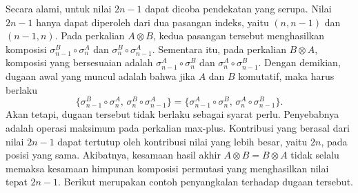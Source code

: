 Secara alami, untuk nilai $2n-1$ dapat dicoba pendekatan yang serupa. Nilai $2n-1$ hanya dapat diperoleh dari dua pasangan indeks, yaitu $(n,n-1)$ dan $(n-1,n)$. Pada perkalian $A \otimes B$, kedua pasangan tersebut menghasilkan komposisi $\sigma_{n-1}^B\circ\sigma_n^A$ dan $\sigma_n^B\circ\sigma_{n-1}^A$. Sementara itu, pada perkalian $B\otimes A$,
komposisi yang bersesuaian adalah $\sigma_{n-1}^A\circ\sigma_n^B$ dan
$\sigma_n^A\circ\sigma_{n-1}^B$. Dengan demikian, dugaan awal yang muncul
adalah bahwa jika $A$ dan $B$ komutatif, maka harus berlaku
\[
  \{
  \sigma_{n-1}^B\circ\sigma_n^A,\,
  \sigma_n^B\circ\sigma_{n-1}^A
  \}
  =
  \{
  \sigma_{n-1}^A\circ\sigma_n^B,\,
  \sigma_n^A\circ\sigma_{n-1}^B
  \}.
\]
Akan tetapi, dugaan tersebut tidak berlaku sebagai syarat perlu. Penyebabnya
adalah operasi maksimum pada perkalian max-plus. Kontribusi yang berasal dari
nilai $2n-1$ dapat tertutup oleh kontribusi nilai yang lebih besar, yaitu
$2n$, pada posisi yang sama. Akibatnya, kesamaan hasil akhir
$A\otimes B=B\otimes A$ tidak selalu memaksa kesamaan himpunan komposisi
permutasi yang menghasilkan nilai tepat $2n-1$. Berikut merupakan contoh penyangkalan terhadap dugaan tersebut.
